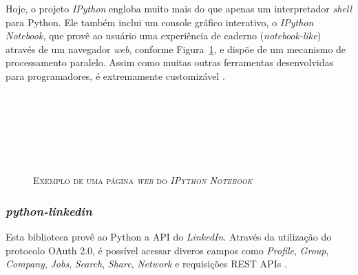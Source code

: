 Hoje, o projeto \textit{IPython} engloba muito mais do que apenas um interpretador \textit{shell} para Python. Ele também inclui um console gráfico interativo, o \textit{IPython Notebook}, que provê ao usuário uma experiência de caderno (\textit{notebook-like}) através de um navegador \textit{web}, conforme Figura~\ref{ipython-fig}, e dispõe de um mecanismo de processamento paralelo. Assim como muitas outras ferramentas desenvolvidas para programadores, é extremamente customizável \cite{mining-social-web}. \\ \\ \\ \\ \\ \\ \\

\begin{figure}[h!]
  \centering
  \caption{\textsc{Exemplo de uma página \textit{web} do \textit{IPython Notebook}}}
  \vspace{-0.3cm}
  \label{ipython-fig}
\end{figure}

\subsubsection{\textbf{\textit{python-linkedin}}}
Esta biblioteca provê ao Python a API do \textit{LinkedIn}. Através da utilização do protocolo OAuth 2.0, é possível acessar diveros campos como \textit{Profile}, \textit{Group}, \textit{Company}, \textit{Jobs}, \textit{Search}, \textit{Share}, \textit{Network} e requisições REST APIs \cite{python-linkedin}.

